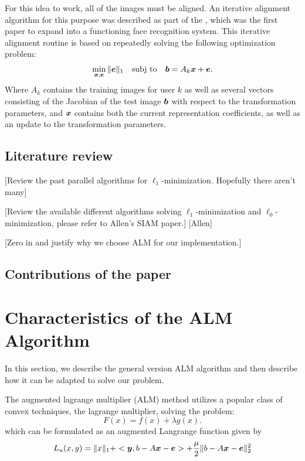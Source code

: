 \documentclass[10pt,twocolumn,letterpaper]{article}
\begin{document}
For this idea to work, all of the images must be aligned. An iterative alignment
algorithm for this purpose was described as part of the \cite{Wagner2009-CVPR}, which was
the first paper to expand \cite{Wright2009-PAMI} into a functioning face recognition system.
This iterative alignment routine is based on repeatedly solving the following optimization problem:
\begin{equation}
\min_{{\boldsymbol{x}}, \boldsymbol{e}} \|\boldsymbol{e}\|_1 \quad \textup{subj to} \quad \boldsymbol{b} = A_k {\boldsymbol{x}} + \boldsymbol{e}.
\end{equation}
Where $A_k$ contains the training images for user $k$ as well as several vectors consisting of the
Jacobian of the test image $\boldsymbol{b}$ with respect to the transformation parameters, and ${\boldsymbol{x}}$ contains
both the current representation coefficients, as well as an update to the transformation parameters.

\subsection{Literature review}
[Review the past parallel algorithms for $\ell_1$-minimization. Hopefully there aren't many]

[Review the available different algorithms solving $\ell_1$-minimization and $\ell_0$-minimization, please refer to Allen's SIAM paper.]
[Allen]

[Zero in and justify why we choose ALM for our implementation.]

\subsection{Contributions of the paper}

\section{Characteristics of the ALM Algorithm}

In this section, we describe the general version ALM algorithm and then describe how it can be adapted to solve our problem.

The augmented lagrange multiplier (ALM) method utilizes a popular class of convex techniques, the lagrange multiplier, solving the problem:
\begin{equation}
F(x) = f(x) + \lambda g(x).
\end{equation}
which can be formulated as an augmented Langrange function given by
\begin{equation}
L_u(x,y) = \|x\|_1 + <\boldsymbol{y}, b - A{\boldsymbol{x}} - \boldsymbol{e}> + \frac{\mu}2 \| b-A{\boldsymbol{x}}-\boldsymbol{e} \|_2^2
\end{equation}
\end{document}
